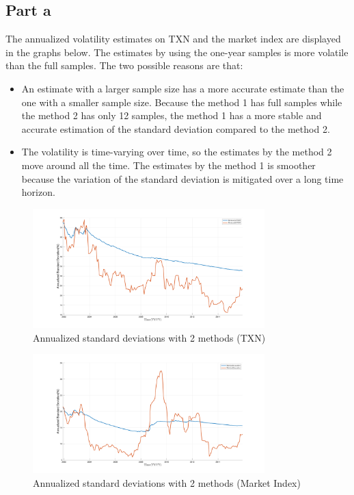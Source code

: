 \documentclass{report}
\begin{document}
\subsection{Part a}
The annualized volatility estimates on TXN and the market index are displayed in the graphs below. The estimates by using the one-year samples is more volatile than the full samples. The two possible reasons are that:
\begin{itemize}
\item An estimate with a larger sample size has a more accurate estimate than the one with a smaller sample size. Because the method 1 has full samples while the method 2 has only 12 samples, the method 1 has a more stable and accurate estimation of the standard deviation compared to the method 2.
\item The volatility is time-varying over time, so the estimates by the method 2 move around all the time. The estimates by the method 1 is smoother because the variation of the standard deviation is mitigated over a long time horizon.
\end{itemize}
\begin{figure}[H]
	\centering
	\includegraphics[width=0.8\textwidth]{figures/2A_TXN}
	\caption{Annualized standard deviations with 2 methods (TXN)}
\end{figure}

\begin{figure}[H]
	\centering
	\includegraphics[width=0.8\textwidth]{figures/2A_mkt}
	\caption{Annualized standard deviations with 2 methods (Market Index)}
\end{figure}
\end{document}
